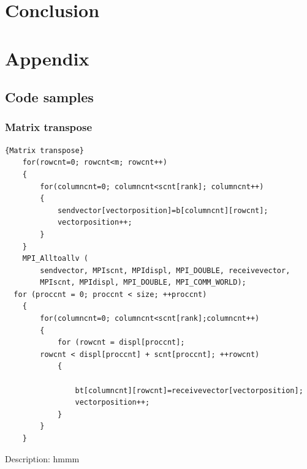 \documentclass{article}
\begin{document}
\section{Conclusion}

\section{Appendix}
\subsection{Code samples}
\subsubsection{Matrix transpose\label{matrixtranspose}}
\begin{lstlisting}[caption=Matrix transposition using MPI]{Matrix transpose}
    for(rowcnt=0; rowcnt<m; rowcnt++)
    {
        for(columncnt=0; columncnt<scnt[rank]; columncnt++)
        {
            sendvector[vectorposition]=b[columncnt][rowcnt];
            vectorposition++;
        }
    }
    MPI_Alltoallv (
        sendvector,	MPIscnt, MPIdispl, MPI_DOUBLE, receivevector,
        MPIscnt, MPIdispl, MPI_DOUBLE, MPI_COMM_WORLD);
  for (proccnt = 0; proccnt < size; ++proccnt)
    {
        for(columncnt=0; columncnt<scnt[rank];columncnt++)
        {
            for (rowcnt = displ[proccnt]; 
		rowcnt < displ[proccnt] + scnt[proccnt]; ++rowcnt)
            {

                bt[columncnt][rowcnt]=receivevector[vectorposition];
                vectorposition++;
            }
        }
    }
\end{lstlisting}
Description: hmmm
\end{document}
